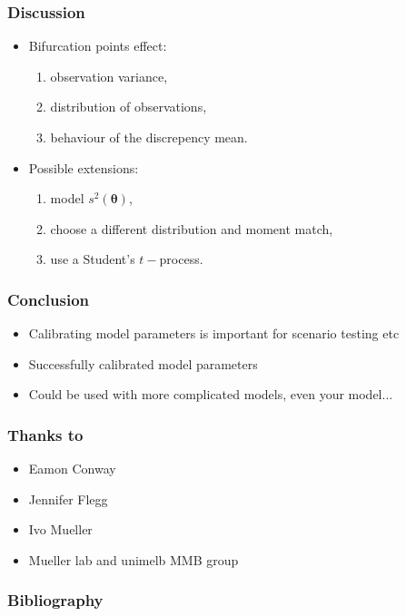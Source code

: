 \documentclass{beamer}
\begin{document}
\begin{frame}
    \frametitle{Discussion}
    \begin{itemize}
        \item Bifurcation points effect:
              \begin{enumerate}
                  \item observation variance,
                  \item distribution of observations,
                  \item behaviour of the discrepency mean.
              \end{enumerate}
        \item Possible extensions:
              \begin{enumerate}
                  \item <2-> model $s^2(\bm{\theta})$,
                  \item <3-> choose a different distribution and moment match,
                  \item <4-> use a Student's $t-$process.
              \end{enumerate}
    \end{itemize}
\end{frame}

\begin{frame}
    \frametitle{Conclusion}
    \begin{itemize}
        \item Calibrating model parameters is important for scenario testing etc
        \item Successfully calibrated model parameters
        \item Could be used with more complicated models, even your model...
    \end{itemize}
\end{frame}

\begin{frame}
    \frametitle{Thanks to}
    \begin{itemize}
        \item Eamon Conway
        \item Jennifer Flegg
        \item Ivo Mueller
        \item Mueller lab and unimelb MMB group
    \end{itemize}
\end{frame}

\begin{frame}
    \frametitle{Bibliography}
    \printbibliography
\end{frame}
\end{document}
